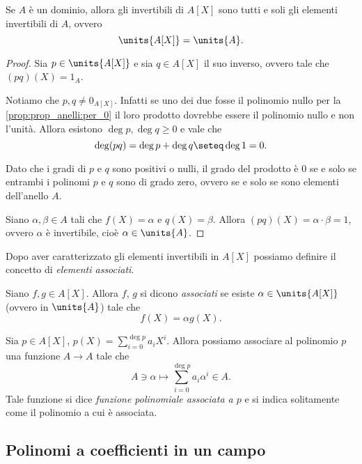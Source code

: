 \begin{corollary}
    Se $A$ è un dominio, allora gli invertibili di $A[X]$ sono tutti e soli gli elementi invertibili di $A$, ovvero \[
        \units{A[X]} = \units{A}. 
    \]
\end{corollary}
\begin{proof}
    Sia $p \in \units{A[X]}$ e sia $q \in A[X]$ il suo inverso, ovvero tale che $(pq)(X) = 1_A$.

    Notiamo che $p, q \neq 0_{A[X]}$. Infatti se uno dei due fosse il polinomio nullo per la \autoref{prop:prop_anelli:per_0} il loro prodotto dovrebbe essere il polinomio nullo e non l'unità. Allora esistono $\deg p, \deg q \geq 0$ e vale che \[
        \deg (pq) = \deg p + \deg q \seteq \deg 1 = 0.    
    \]

    Dato che i gradi di $p$ e $q$ sono positivi o nulli, il grado del prodotto è $0$ se e solo se entrambi i polinomi $p$ e $q$ sono di grado zero, ovvero se e solo se sono elementi dell'anello $A$.

    Siano $\alpha, \beta \in A$ tali che $f(X) = \alpha$ e $q(X) = \beta$. Allora $(pq)(X) = \alpha \cdot \beta = 1$, ovvero $\alpha$ è invertibile, cioè $\alpha \in \units{A}$.
\end{proof}

Dopo aver caratterizzato gli elementi invertibili in $A[X]$ possiamo definire il concetto di \emph{elementi associati}.

\begin{definition}
    Siano $f, g \in A[X]$. Allora $f$, $g$ si dicono \emph{associati} se esiste $\alpha \in \units{A[X]}$ (ovvero in $\units{A}$) tale che \[
        f(X) = \alpha g(X).    
    \]
\end{definition}

\begin{definition}
    Sia $p \in A[X]$, $p(X) = \sum_{i = 0}^{\deg p} a_iX^i$. Allora possiamo associare al polinomio $p$ una funzione $A \to A$ tale che \begin{equation}
        A \ni \alpha \mapsto \sum_{i = 0}^{\deg p} a_i{\alpha}^i \in A.
    \end{equation} Tale funzione si dice \emph{funzione polinomiale associata a $p$} e si indica solitamente come il polinomio a cui è associata.
\end{definition}

\subsection{Polinomi a coefficienti in un campo}

